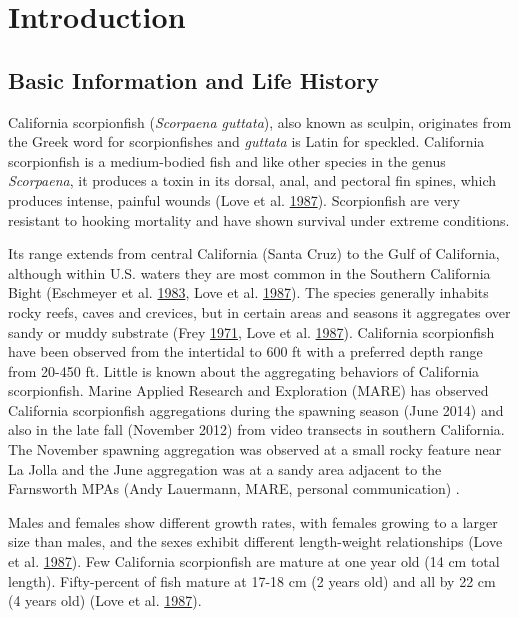 \documentclass[12pt,]{article}
\begin{document}

\section{Introduction}\label{introduction}

\subsection{Basic Information and Life
History}\label{basic-information-and-life-history}

California scorpionfish (\emph{Scorpaena guttata}), also known as
sculpin, originates from the Greek word for scorpionfishes and
\emph{guttata} is Latin for speckled. California scorpionfish is a
medium-bodied fish and like other species in the genus \emph{Scorpaena},
it produces a toxin in its dorsal, anal, and pectoral fin spines, which
produces intense, painful wounds (Love et al.
\protect\hyperlink{ref-Love1987}{1987}). Scorpionfish are very resistant
to hooking mortality and have shown survival under extreme conditions.

Its range extends from central California (Santa Cruz) to the Gulf of
California, although within U.S. waters they are most common in the
Southern California Bight (Eschmeyer et al.
\protect\hyperlink{ref-Eschmeyer1983}{1983}, Love et al.
\protect\hyperlink{ref-Love1987}{1987}). The species generally inhabits
rocky reefs, caves and crevices, but in certain areas and seasons it
aggregates over sandy or muddy substrate (Frey
\protect\hyperlink{ref-Frey1971}{1971}, Love et al.
\protect\hyperlink{ref-Love1987}{1987}). California scorpionfish have
been observed from the intertidal to 600 ft with a preferred depth range
from 20-450 ft. Little is known about the aggregating behaviors of
California scorpionfish. Marine Applied Research and Exploration (MARE)
has observed California scorpionfish aggregations during the spawning
season (June 2014) and also in the late fall (November 2012) from video
transects in southern California. The November spawning aggregation was
observed at a small rocky feature near La Jolla and the June aggregation
was at a sandy area adjacent to the Farnsworth MPAs (Andy Lauermann,
MARE, personal communication) .

Males and females show different growth rates, with females growing to a
larger size than males, and the sexes exhibit different length-weight
relationships (Love et al. \protect\hyperlink{ref-Love1987}{1987}). Few
California scorpionfish are mature at one year old (14 cm total length).
Fifty-percent of fish mature at 17-18 cm (2 years old) and all by 22 cm
(4 years old) (Love et al. \protect\hyperlink{ref-Love1987}{1987}).
\end{document}
